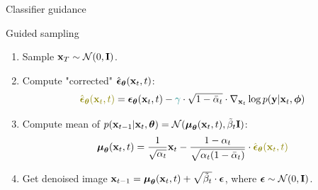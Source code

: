 \begin{frame}{Classifier guidance}
	\begin{block}{Guided sampling}
		\begin{enumerate}
			\item Sample $\mathbf{x}_T \sim \mathcal{N}(0, \mathbf{I})$.
			\item Compute "corrected" $\hat{\boldsymbol{\epsilon}}_{\boldsymbol{\theta}}(\mathbf{x}_t, t)$:
			\[
				{\color{olive}\hat{\bepsilon}_{\btheta}(\bx_t, t)} = \bepsilon_{\btheta}(\bx_t, t) - {\color{teal}\gamma} \cdot \sqrt{1 - \bar{\alpha}_t} \cdot \nabla_{\bx_t} \log p(\by | \bx_t, \bphi)
			\]
			\item Compute mean of $p(\mathbf{x}_{t-1} | \mathbf{x}_t, \boldsymbol{\theta}) = \mathcal{N}(\boldsymbol{\mu}_{\boldsymbol{\theta}}(\mathbf{x}_t, t), \tilde{\beta}_t \mathbf{I})$:
			\[
				\bmu_{\btheta}(\bx_t, t) = \frac{1}{\sqrt{\alpha_t}} \bx_t - \frac{1 - \alpha_t}{\sqrt{\alpha_t (1 - \bar{\alpha}_t)}} \cdot  	{\color{olive}\hat{\bepsilon}_{\btheta}(\bx_t, t)}
			\]
			\vspace{-0.3cm}
			\item Get denoised image $\mathbf{x}_{t - 1} = \boldsymbol{\mu}_{\boldsymbol{\theta}}(\mathbf{x}_t, t) +  \sqrt{\tilde{\beta}_t} \cdot \boldsymbol{\epsilon}$, where $\boldsymbol{\epsilon} \sim \mathcal{N}(0, \mathbf{I})$.
		\end{enumerate}
	\end{block}
\end{frame}
